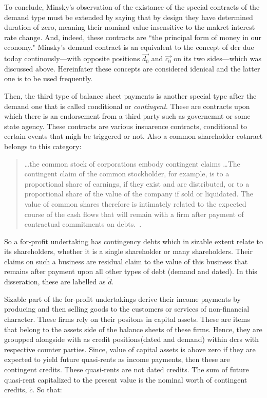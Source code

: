 To conclude, Minsky's observation of the existance of the special contracts of the demand type must be extended by saying that by design they have determined duration of zero, meaning their nominal value insensitive to the makret interest rate change. And, indeed, these contracts are ``the principal form of money in our economy." Minsky's demand contract is an equivalent to the concept of \acf{dcr} due today continously---with opposite positions $\overrightarrow{d_{0}}$ and $\overrightarrow{c_{0}}$ on its two sides---which was discussed above. Hereinfater these concepts are considered idenical and the latter one is to be used frequently.

Then, the third type of balance sheet payments is another special type after the demand one that is called conditional or \textit{contingent}. These are contracts upon which there is an endorsement from a third party such as governemnt or some state agency. These contracts are various insuarence contracts, conditional to certain events that migh be triggered or not. Also a common shareholder cotnract belongs to this category:

\begin{quote}
\dots the common stock of corporations embody contingent claims \dots The contingent claim of the common stockholder, for example, is to a proportional share of earnings, if they exist and are distributed, or to a proportional share of the value of the company if sold or liquidated. The value of common shares therefore is intimately related to the expected course of the cash flows that will remain with a firm after payment of contractual commitments on debts.~\citep[p.~226, emphasis added]{minsky1986}.
\end{quote}

So a for-profit undertaking has contingency debts which in sizable extent relate to its shareholders, whether it is a single shareholder or many shareholders. Their claims on such a business are residual claim to the value of this business that remains after payment upon all other types of debt (demand and dated). In this disseration, these are labelled as $\widetilde{d}$.

Sizable part of the for-profit undertakings derive their income payments by producing and then selling goods to the customers or services of non-financial character. These firms rely on their positons in capital assets. These are items that belong to the assets side of the balance sheets of these firms. Hence, they are groupped alongside with as credit positions(dated and demand) within \acfp{dcr} with respective counter parties. Since, value of capital assets is above zero if they are expected to yield future quasi-rents as income payments, then these are contingent credits. These quasi-rents are not dated credits. The sum of future quasi-rent capitalized to the present value is the nominal worth of contingent credits, $\widetilde{c}$. So that:

